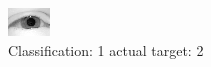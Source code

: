 \begin{figure}[h!]
\begin{center}
\includegraphics[width=0.60\columnwidth]{figures/ID2297_class_1_target_2.png}
\end{center}
\caption{ Classification: 1 actual target: 2}
\label{fig:ID2297_class_1_target_2}
\end{figure}
